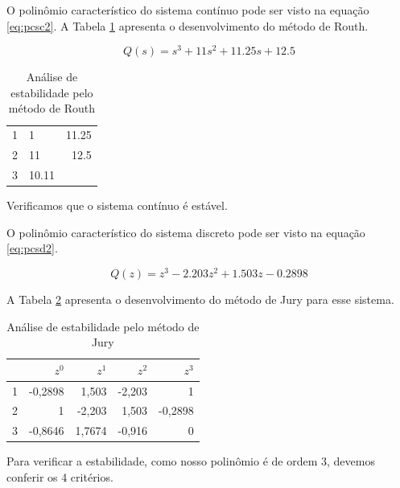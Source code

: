     O polinômio característico do sistema contínuo pode ser visto na equação \ref{eq:pcsc2}. A Tabela 
    \ref{tab:RE2} apresenta o desenvolvimento do método de Routh. 
    
    \begin{equation}
        Q(s) = s^3+11s^2+11.25s+12.5
        \label{eq:pcsc2}
    \end{equation}

    \begin{table}[!ht]
        \centering
        \vspace{0.5cm}
        \caption{Análise de estabilidade pelo método de Routh} 
        \begin{tabular}{r|lr}
            
            1 & 1 & 11.25 \\
            2 & 11 & 12.5 \\
            3 & 10.11\\
        \end{tabular}                
        \label{tab:RE2}
    \end{table}

    Verificamos que o sistema contínuo é estável.

    O polinômio característico do sistema discreto pode ser visto na equação \ref{eq:pcsd2}.

    \begin{equation}
        Q(z) = z^3 - 2.203 z^2 + 1.503 z - 0.2898
        \label{eq:pcsd2}
    \end{equation}

    A Tabela \ref{tab:JE2} apresenta o desenvolvimento do método de Jury para esse sistema.

    \begin{table}[!ht]
        \centering
        \caption{Análise de estabilidade pelo método de Jury} 
        \begin{tabular}{l| r r r r}
            & $z^0$ & $z^1$ & $z^2$ & $z^3$\\
            \hline
            1 & -0{,}2898 & 1{,}503 & -2{,}203 & 1\\
            2 & 1 & -2{,}203 & 1{,}503 & -0{,}2898\\
            3 & -0{,}8646 & 1{,}7674 & -0{,}916 & 0\\
        \end{tabular}                
        \label{tab:JE2}
    \end{table}

    Para verificar a estabilidade, como nosso polinômio é de ordem 3, devemos conferir os 4 critérios.

